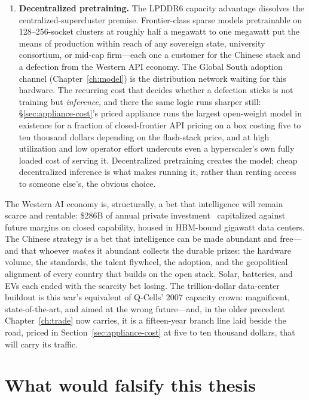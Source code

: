 \begin{enumerate}
  \item \textbf{Decentralized pretraining.} The LPDDR6 capacity advantage dissolves the centralized-supercluster premise. Frontier-class sparse models pretrainable on 128--256-socket clusters at roughly half a megawatt to one megawatt put the means of production within reach of any sovereign state, university consortium, or mid-cap firm---each one a customer for the Chinese stack and a defection from the Western API economy. The Global South adoption channel (Chapter~\ref{ch:model}) is the distribution network waiting for this hardware. The recurring cost that decides whether a defection sticks is not training but \emph{inference}, and there the same logic runs sharper still: \S\ref{sec:appliance-cost}'s priced appliance runs the largest open-weight model in existence for a fraction of closed-frontier API pricing on a box costing five to ten thousand dollars depending on the flash-stack price, and at high utilization and low operator effort undercuts even a hyperscaler's own fully loaded cost of serving it. Decentralized pretraining creates the model; cheap decentralized inference is what makes running it, rather than renting access to someone else's, the obvious choice.
\end{enumerate}

The Western AI economy is, structurally, a bet that intelligence will remain scarce and rentable: \$286B of annual private investment~\cite{stanford-aiindex-2026} capitalized against future margins on closed capability, housed in HBM-bound gigawatt data centers. The Chinese strategy is a bet that intelligence can be made abundant and free---and that whoever \emph{makes} it abundant collects the durable prizes: the hardware volume, the standards, the talent flywheel, the adoption, and the geopolitical alignment of every country that builds on the open stack. Solar, batteries, and EVs each ended with the scarcity bet losing. The trillion-dollar data-center buildout is this war's equivalent of Q-Cells' 2007 capacity crown: magnificent, state-of-the-art, and aimed at the wrong future---and, in the older precedent Chapter~\ref{ch:trade} now carries, it is a fifteen-year branch line laid beside the road, priced in Section~\ref{sec:appliance-cost} at five to ten thousand dollars, that will carry its traffic.

\section{What would falsify this thesis}
\label{sec:falsify}

